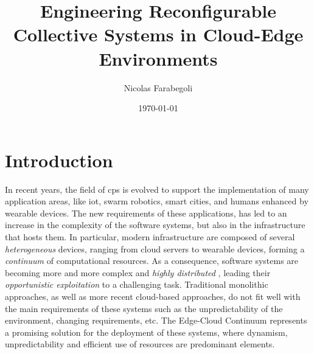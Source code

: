 \documentclass[12pt,a4paper]{article}
\title{Engineering Reconfigurable Collective Systems in Cloud-Edge Environments}
\author{Nicolas Farabegoli}
\date{\monthyeardate\today}
\begin{document}
\maketitle

\section{Introduction}\label{sec:introduction}

%
%
%

In recent years,
the field of \ac{cps} is evolved to support the implementation of many application areas,
like \ac{iot}, swarm robotics, smart cities, and humans enhanced by wearable devices. 
%
The new requirements of these applications,
has led to an increase in the complexity of the software systems,
but also in the infrastructure that hosts them.
%
In particular,
modern infrastructure are composed of several \emph{heterogeneous} devices,
ranging from cloud servers to wearable devices,
forming a \emph{continuum} of computational resources.
%
As a consequence,
software systems are becoming more and more complex and \emph{highly distributed} ,
leading their \emph{opportunistic exploitation} to a challenging task. 
%
Traditional monolithic approaches,
as well as more recent cloud-based approaches,
do not fit well with the main requirements of these systems such as the unpredictability of the environment,
changing requirements, etc. 
%
The Edge-Cloud Continuum represents a promising solution for the deployment of these systems,
where dynamism,
unpredictability and efficient use of resources are predominant elements.
\end{document}

